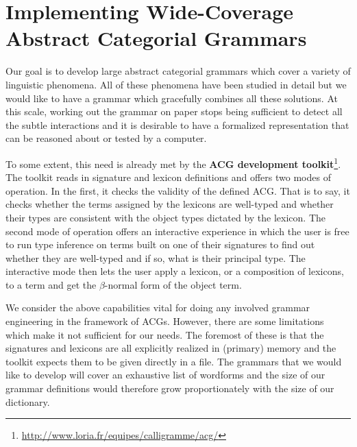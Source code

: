 \chapter{Implementing Wide-Coverage Abstract Categorial Grammars}
\label{chap:implementation}

Our goal is to develop large abstract categorial grammars which cover a
variety of linguistic phenomena. All of these phenomena have been
studied in detail but we would like to have a grammar which gracefully
combines all these solutions. At this scale, working out the grammar on
paper stops being sufficient to detect all the subtle interactions and
it is desirable to have a formalized representation that can be reasoned
about or tested by a computer.

To some extent, this need is already met by the \textbf{ACG development
  toolkit}\footnote{\url{http://www.loria.fr/equipes/calligramme/acg/}}. The
toolkit reads in signature and lexicon definitions and offers two modes
of operation. In the first, it checks the validity of the defined
ACG. That is to say, it checks whether the terms assigned by the
lexicons are well-typed and whether their types are consistent with the
object types dictated by the lexicon. The second mode of operation
offers an interactive experience in which the user is free to run type
inference on terms built on one of their signatures to find out whether
they are well-typed and if so, what is their principal type. The
interactive mode then lets the user apply a lexicon, or a composition of
lexicons, to a term and get the $\beta$-normal form of the object term.

We consider the above capabilities vital for doing any involved grammar
engineering in the framework of ACGs. However, there are some
limitations which make it not sufficient for our needs. The foremost of
these is that the signatures and lexicons are all explicitly realized in
(primary) memory and the toolkit expects them to be given directly in a
file. The grammars that we would like to develop will cover an
exhaustive list of wordforms and the size of our grammar definitions
would therefore grow proportionately with the size of our dictionary.


